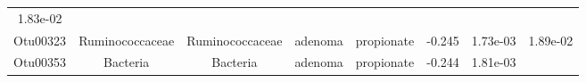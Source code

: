 \documentclass[11pt,]{article}
\begin{document}
\begin{longtable}[]{@{}cccccccc@{}}
\begin{minipage}[t]{0.08\columnwidth}
1.83e-02\strut
\end{minipage}\tabularnewline
\begin{minipage}[t]{0.08\columnwidth}\centering\strut
Otu00323\strut
\end{minipage} & \begin{minipage}[t]{0.15\columnwidth}\centering\strut
Ruminococcaceae\strut
\end{minipage} & \begin{minipage}[t]{0.15\columnwidth}\centering\strut
Ruminococcaceae\strut
\end{minipage} & \begin{minipage}[t]{0.08\columnwidth}\centering\strut
adenoma\strut
\end{minipage} & \begin{minipage}[t]{0.09\columnwidth}\centering\strut
propionate\strut
\end{minipage} & \begin{minipage}[t]{0.07\columnwidth}\centering\strut
-0.245\strut
\end{minipage} & \begin{minipage}[t]{0.08\columnwidth}\centering\strut
1.73e-03\strut
\end{minipage} & \begin{minipage}[t]{0.08\columnwidth}\centering\strut
1.89e-02\strut
\end{minipage}\tabularnewline
\begin{minipage}[t]{0.08\columnwidth}\centering\strut
Otu00353\strut
\end{minipage} & \begin{minipage}[t]{0.15\columnwidth}\centering\strut
Bacteria\strut
\end{minipage} & \begin{minipage}[t]{0.15\columnwidth}\centering\strut
Bacteria\strut
\end{minipage} & \begin{minipage}[t]{0.08\columnwidth}\centering\strut
adenoma\strut
\end{minipage} & \begin{minipage}[t]{0.09\columnwidth}\centering\strut
propionate\strut
\end{minipage} & \begin{minipage}[t]{0.07\columnwidth}\centering\strut
-0.244\strut
\end{minipage} & \begin{minipage}[t]{0.08\columnwidth}\centering\strut
1.81e-03\strut
\end{minipage} & \begin{minipage}[t]{0.08\columnwidth}\centering\strut

\end{minipage}
\end{longtable}
\end{document}
